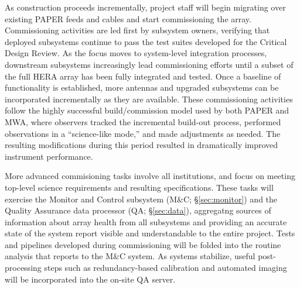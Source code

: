 \documentclass[preprint]{aastex}
\begin{document}
As construction proceeds incrementally, project staff will begin migrating over existing PAPER feeds and cables 
and start commissioning the array.  
Commissioning activities are led first by subsystem owners, verifying that deployed subsystems 
continue to pass the test suites developed for the Critical Design Review.
As the focus moves to system-level integration processes, downstream subsystems increasingly
lead commissioning efforts until a subset of the full HERA
array has been fully integrated and tested.  Once a baseline of functionality is established,
more antennas and upgraded subsystems can be incorporated incrementally as they are available.
These commissioning activities follow the highly successful
build/commission model used by both PAPER and MWA, %
where observers tracked the incremental build-out
process, performed observations in a ``science-like mode,'' and made
adjustments as needed. The resulting modifications during this period resulted
in dramatically improved instrument performance.  

More advanced commisioning tasks involve all institutions, and
focus on meeting top-level science requirements
and resulting specifications.  %
These tasks will exercise the Monitor and Control subsystem (M\&C; \S\ref{sec:monitor})
and the Quality Assurance data processor (QA; \S\ref{sec:data}), 
aggregatng sources of
information about array health from all subsystems and providing an accurate
state of the system report visible and understandable to the entire project.
Tests and pipelines developed during commissioning will be folded into
the routine analysis that reports to the M\&C system.  As systems stabilize,
useful post-processing steps such as redundancy-based calibration and automated
imaging will be incorporated into the on-site QA server.

\end{document}
